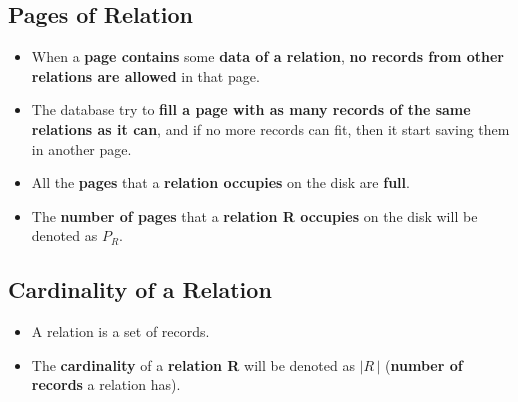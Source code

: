 \documentclass[10pt]{article}
\begin{document}
\subsection{Pages of Relation}
	\begin{itemize}
	\item
	When a \textbf{page contains} some \textbf{data of a relation}, \textbf{no records from other relations are allowed} in that page.
	\item
	The database try to\textbf{ fill a page with as many records of the same relations as it can}, and if no more records can fit, then it start saving them in another page.
	\item
All the \textbf{pages} that a \textbf{relation occupies} on the disk are \textbf{full}.
	\item
The \textbf{number of pages} that a \textbf{relation R occupies} on the disk will be denoted as $P_R$.
	\end{itemize}

\subsection{Cardinality of a Relation}
	\begin{itemize}
	\item
	A relation is a set of records.
	\item
	The \textbf{cardinality} of a \textbf{relation R} will be denoted as $|R\,|$ (\textbf{number of records} a relation has).
	\end{itemize}
\end{document}
